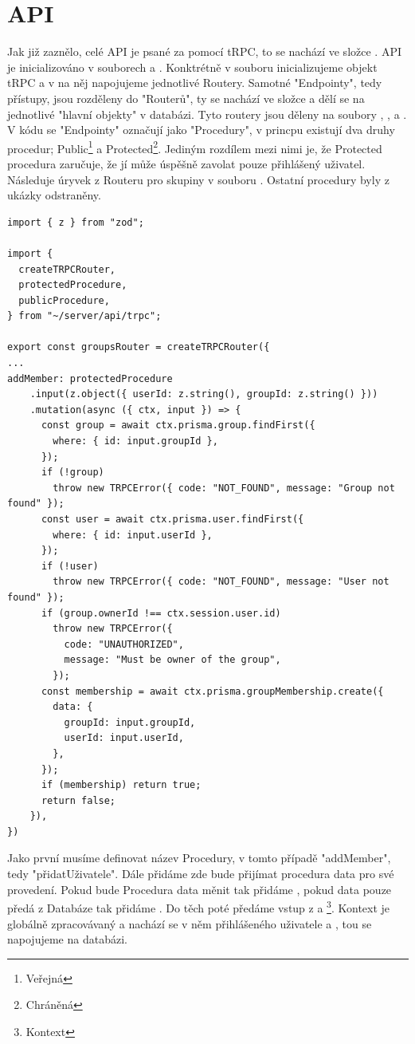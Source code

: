 \section{API}
Jak již zaznělo, celé API je psané za pomocí tRPC, to se nachází ve složce .
API je inicializováno v souborech  a . Konktrétně v souboru  inicializujeme objekt tRPC a v  na něj napojujeme jednotlivé Routery. Samotné "Endpointy", tedy přístupy, jsou rozděleny do "Routerů", ty se nachází ve složce  a dělí se na jednotlivé "hlavní objekty" v databázi. Tyto routery jsou děleny na soubory , ,  a . V kódu se "Endpointy" označují jako "Procedury", v princpu existují dva druhy procedur; Public\footnote{Veřejná} a Protected\footnote{Chráněná}. Jediným rozdílem mezi nimi je, že Protected procedura zaručuje, že jí může úspěšně zavolat pouze přihlášený uživatel.
Následuje úryvek z Routeru pro skupiny v souboru . Ostatní procedury byly z ukázky odstraněny.
\begin{lstlisting}[caption={Procedura na přidání uživatele do skupiny}]
import { z } from "zod";

import {
  createTRPCRouter,
  protectedProcedure,
  publicProcedure,
} from "~/server/api/trpc";

export const groupsRouter = createTRPCRouter({
...
addMember: protectedProcedure
    .input(z.object({ userId: z.string(), groupId: z.string() }))
    .mutation(async ({ ctx, input }) => {
      const group = await ctx.prisma.group.findFirst({
        where: { id: input.groupId },
      });
      if (!group)
        throw new TRPCError({ code: "NOT_FOUND", message: "Group not found" });
      const user = await ctx.prisma.user.findFirst({
        where: { id: input.userId },
      });
      if (!user)
        throw new TRPCError({ code: "NOT_FOUND", message: "User not found" });
      if (group.ownerId !== ctx.session.user.id)
        throw new TRPCError({
          code: "UNAUTHORIZED",
          message: "Must be owner of the group",
        });
      const membership = await ctx.prisma.groupMembership.create({
        data: {
          groupId: input.groupId,
          userId: input.userId,
        },
      });
      if (membership) return true;
      return false;
    }),
})
\end{lstlisting}
Jako první musíme definovat název Procedury, v tomto případě "addMember", tedy "přidatUživatele". Dále přidáme  zde bude přijímat procedura data pro své provedení. Pokud bude Procedura data měnit tak přidáme , pokud data pouze předá z Databáze tak přidáme . Do těch poté předáme vstup z  a \footnote{Kontext}. Kontext je globálně zpracovávaný a nachází se v něm  přihlášeného uživatele a , tou se napojujeme na databázi.

